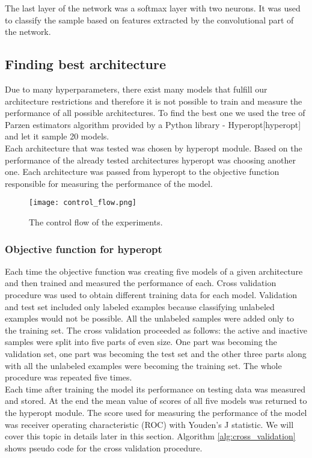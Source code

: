\documentclass[a4paper,10pt]{report}
\begin{document}
      The last layer of the network was a softmax layer with two neurons. It was used to classify the sample based on features extracted by the convolutional part of the network.\\
      
	\subsection{Finding best architecture}
	Due to many hyperparameters, there exist many models that fulfill our architecture restrictions and therefore it is not possible to train and measure the performance of all possible architectures. To find the best one we used the tree of Parzen estimators algorithm provided by a Python library - Hyperopt[hyperopt] and let it sample 20 models.\\
	
	Each architecture that was tested was chosen by hyperopt module. Based on the performance of the already tested architectures hyperopt was choosing another one. Each architecture was passed from hyperopt to the objective function responsible for measuring the performance of the model.\\
	
	 \begin{figure}[h!]
	  \centering
	  \texttt{[image: control\_flow.png]}
	  \caption{The control flow of the experiments.}
	  \label{fig:control_flow}
	\end{figure} 
	
	\subsubsection{Objective function for hyperopt}
	Each time the objective function was creating five models of a given architecture and then trained and measured the performance of each. Cross validation procedure was used to obtain different training data for each model. Validation and test set included only labeled examples because classifying unlabeled examples would not be possible. All the unlabeled samples were added only to the training set. The cross validation proceeded as follows: the active and inactive samples were split into five parts of even size. One part was becoming the validation set, one part was becoming the test set and the other three parts along with all the unlabeled examples were becoming the training set. The whole procedure was repeated five times.\\
	
	Each time after training the model its performance on testing data was measured and stored. At the end the mean value of scores of all five models was returned to the hyperopt module. The score used for measuring the performance of the model was receiver operating characteristic (ROC) with Youden's J statistic. We will cover this topic in details later in this section. Algorithm \ref{alg:cross_validation} shows pseudo code for the cross validation procedure.\\
	
\end{document}
